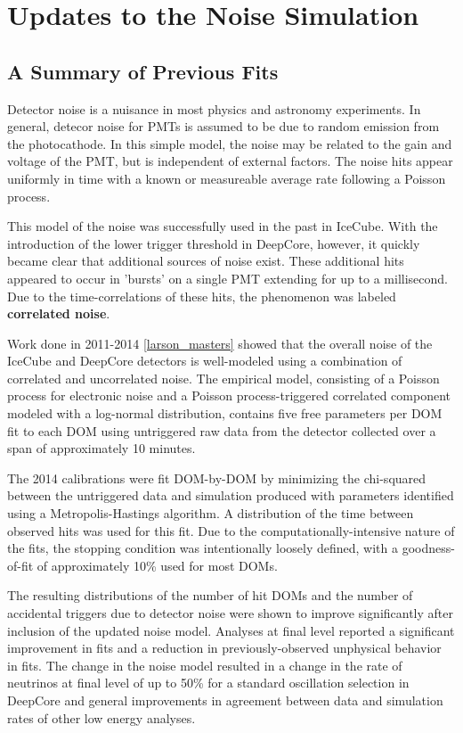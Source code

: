 \chapter{Updates to the Noise Simulation}

\label{sec:old_vuvuzela}
\section{A Summary of Previous Fits}
Detector noise is a nuisance in most physics and astronomy experiments. 
In general, detecor noise for PMTs is assumed to be due to random emission from the photocathode.
In this simple model, the noise may be related to the gain and voltage of the PMT, but is independent of external factors.
The noise hits appear uniformly in time with a known or measureable average rate following a Poisson process.

This model of the noise was successfully used in the past in IceCube. 
With the introduction of the lower trigger threshold in DeepCore, however, it quickly became clear that additional sources of noise exist.
These additional hits appeared to occur in 'bursts' on a single PMT extending for up to a millisecond.
Due to the time-correlations of these hits, the phenomenon was labeled \textbf{correlated noise}.

Work done in 2011-2014 \ref{larson_masters} showed that the overall noise of the IceCube and DeepCore detectors is well-modeled using a combination of correlated and uncorrelated noise.
The empirical model, consisting of a Poisson process for electronic noise and a Poisson process-triggered correlated component modeled with a log-normal distribution, contains five free parameters per DOM fit to each DOM using untriggered raw data from the detector collected over a span of approximately 10 minutes.

The 2014 calibrations were fit DOM-by-DOM by minimizing the chi-squared between the untriggered data and simulation produced with parameters identified using a Metropolis-Hastings algorithm.
A distribution of the time between observed hits was used for this fit.
Due to the computationally-intensive nature of the fits, the stopping condition was intentionally loosely defined, with a goodness-of-fit of approximately 10\% used for most DOMs.

The resulting distributions of the number of hit DOMs and the number of accidental triggers due to detector noise were shown to improve significantly after inclusion of the updated noise model.
Analyses at final level reported a significant improvement in fits and a reduction in previously-observed unphysical behavior in fits.
The change in the noise model resulted in a change in the rate of neutrinos at final level of up to 50\% for a standard oscillation selection in DeepCore and general improvements in agreement between data and simulation rates of other low energy analyses.

